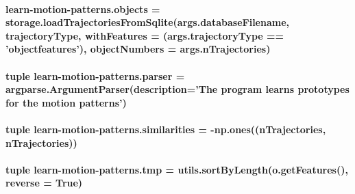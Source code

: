 \hypertarget{namespacelearn-motion-patterns_a242ac9b9cb6e845d06e5e03fbfd36476}{
\paragraph[{objects}]{\setlength{\rightskip}{0pt plus 5cm}learn-\/motion-\/patterns.\-objects = {\bf storage.\-load\-Trajectories\-From\-Sqlite}(args.\-database\-Filename, {\bf trajectory\-Type}, with\-Features = (args.\-trajectory\-Type == 'objectfeatures'), object\-Numbers = args.\-n\-Trajectories)}}\label{namespacelearn-motion-patterns_a242ac9b9cb6e845d06e5e03fbfd36476}
\hypertarget{namespacelearn-motion-patterns_a2ee2575827c62e37bfd79aced1148c60}{
\paragraph[{parser}]{\setlength{\rightskip}{0pt plus 5cm}tuple learn-\/motion-\/patterns.\-parser = argparse.\-Argument\-Parser(description='The program learns prototypes for the motion patterns')}}\label{namespacelearn-motion-patterns_a2ee2575827c62e37bfd79aced1148c60}
\hypertarget{namespacelearn-motion-patterns_ab858728c4958e5b8bdd23a4afaed49cc}{
\paragraph[{similarities}]{\setlength{\rightskip}{0pt plus 5cm}tuple learn-\/motion-\/patterns.\-similarities = -\/np.\-ones(({\bf n\-Trajectories}, {\bf n\-Trajectories}))}}\label{namespacelearn-motion-patterns_ab858728c4958e5b8bdd23a4afaed49cc}
\hypertarget{namespacelearn-motion-patterns_ab1cf5c122059cea6e978c78bd1074946}{
\paragraph[{tmp}]{\setlength{\rightskip}{0pt plus 5cm}tuple learn-\/motion-\/patterns.\-tmp = {\bf utils.\-sort\-By\-Length}(o.\-get\-Features(), reverse = True)}}\label{namespacelearn-motion-patterns_ab1cf5c122059cea6e978c78bd1074946}
